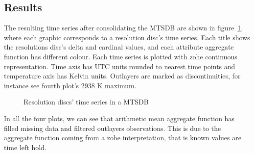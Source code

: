 \subsection{Results}

The resulting time series after consolidating the MTSDB are shown in
figure~\ref{fig:exemple:4mrd}, where each graphic corresponds to a
resolution disc's time series. Each title shows the
resolutions disc's delta and cardinal values, and each attribute
aggregate function has different colour.  Each time series
is plotted with zohe continuous representation. Time axis has
UTC units rounded to nearest time points
and temperature axis has Kelvin
units. Outlayers are marked as discontinuities, for instance see
fourth plot's 2938 K maximum.


\begin{figure}[tp]
  \centering
  
  \caption{Resolution discs' time series in a MTSDB}
  \label{fig:exemple:4mrd}
\end{figure}


In all the four plots, we can see that arithmetic mean aggregate
function has filled missing data and filtered outlayers
observations. This is due to the aggregate function coming from a zohe
interpretation, that is known values are time left hold. 




